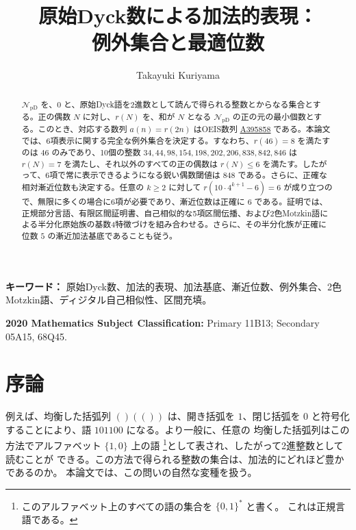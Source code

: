 \documentclass[12pt]{ltjsarticle}
\title{原始Dyck数による加法的表現：\\例外集合と最適位数}
\author{Takayuki Kuriyama}
\date{}
\theoremstyle{plain}
\theoremstyle{definition}
\theoremstyle{plain}
\newcommand{\NpD}{\mathcal{N}_{\mathrm{pD}}}
\newcommand{\seqnum}[1]{\href{https://oeis.org/#1}{\textrm{\underline{#1}}}}
\begin{document}
\maketitle

\begin{abstract}
$\NpD$ を、$0$ と、原始Dyck語を2進数として読んで得られる整数とからなる集合とする。正の偶数 $N$ に対し、$r(N)$ を、和が $N$ となる $\NpD$ の正の元の最小個数とする。このとき、対応する数列 $a(n)=r(2n)$ はOEIS数列 \seqnum{A395858} である。本論文では、6項表示に関する完全な例外集合を決定する。すなわち、$r(46)=8$ を満たすのは $46$ のみであり、10個の整数
$34,44,98,154,198,202,206,838,842,846$ は $r(N)=7$ を満たし、それ以外のすべての正の偶数は $r(N)\leq6$ を満たす。したがって、6項で常に表示できるようになる鋭い偶数閾値は $848$ である。さらに、正確な相対漸近位数も決定する。任意の $k\geq2$ に対して
$r(10\cdot4^{k+1}-6)=6$ が成り立つので、無限に多くの場合に6項が必要であり、漸近位数は正確に $6$ である。証明では、正規部分言語、有限区間証明書、自己相似的な5項区間伝播、および2色Motzkin語による半分化原始族の基数4特徴づけを組み合わせる。さらに、その半分化族が正確に位数 $5$ の漸近加法基底であることも従う。
\end{abstract}

\noindent\textbf{キーワード：} 原始Dyck数、加法的表現、加法基底、漸近位数、例外集合、2色Motzkin語、ディジタル自己相似性、区間充填。

\noindent\textbf{2020 Mathematics Subject Classification:} Primary 11B13;
Secondary 05A15, 68Q45.

\section{序論}\label{sec:introduction}

例えば、均衡した括弧列 $()(())$ は、開き括弧を $1$、閉じ括弧を
$0$ と符号化することにより、語 $101100$ になる。より一般に、任意の
均衡した括弧列はこの方法でアルファベット $\{1,0\}$ 上の語
\footnote{このアルファベット上のすべての語の集合を $\{0,1\}^*$ と書く。
これは正規言語である。}として表され、したがって2進整数として読むことが
できる。この方法で得られる整数の集合は、加法的にどれほど豊かであるのか。
本論文では、この問いの自然な変種を扱う。
\end{document}
